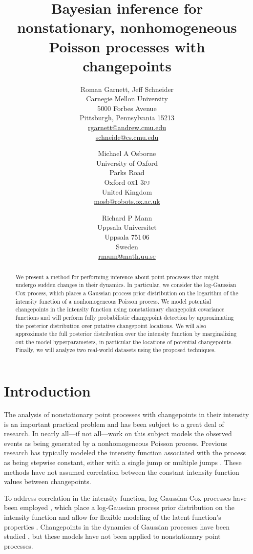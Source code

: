 \documentclass{article}
\title{Bayesian inference for nonstationary, nonhomogeneous Poisson
  processes with changepoints}
\author{
  Roman Garnett, Jeff Schneider\\
  {Carnegie Mellon University}\\
  {5000 Forbes Avenue}\\
  {Pittsburgh, Pennsylvania 15213}\\
  \url{rgarnett@andrew.cmu.edu}\\
  \url{schneide@cs.cmu.edu}
  \and
  Michael A Osborne\\
  {University of Oxford}\\
  {Parks Road}\\
  {Oxford \textsc{ox}1 3\textsc{pj}}\\
  {United Kingdom}\\
  \url{mosb@robots.ox.ac.uk}
  \and
  Richard P Mann\\
  {Uppsala Universitet}\\
  {Uppsala 751\,06}\\
  {Sweden}\\
  \url{rmann@math.uu.se}
}
\begin{document}
\maketitle

\begin{abstract}
  We present a method for performing inference about point processes
  that might undergo sudden changes in their dynamics.  In particular,
  we consider the log-Gaussian Cox process, which places a Gaussian
  process prior distribution on the logarithm of the intensity
  function of a nonhomogeneous Poisson process.  We model potential
  changepoints in the intensity function using nonstationary
  changepoint covariance functions and will perform fully
  probabilistic changepoint detection by approximating the posterior
  distribution over putative changepoint locations.  We will also
  approximate the full posterior distribution over the intensity
  function by marginalizing out the model hyperparameters, in
  particular the locations of potential changepoints.  Finally, we
  will analyze two real-world datasets using the proposed techniques.
\end{abstract}

\section{Introduction}

The analysis of nonstationary point processes with changepoints in
their intensity is an important practical problem and has been subject
to a great deal of research.  In nearly all---if not all---work on
this subject models the observed events as being generated by a
nonhomogeneous Poisson process.  Previous research has typically
modeled the intensity function associated with the process as being
stepwise constant, either with a single jump \citep{rafteryakman,
  carlin, westogden} or multiple jumps \citep{youngkuo, fearnhead,
  adamscp}.  These methods have not assumed correlation between the
constant intensity function values between changepoints.

To address correlation in the intensity function, log-Gaussian Cox
processes have been employed \citep{moller}, which place a
log-Gaussian process prior distribution on the intensity function and
allow for flexible modeling of the latent function's properties
\citep{gpml}.  Changepoints in the dynamics of Gaussian processes have
been studied \citep{cpcj, bocpd}, but these models have not been
applied to nonstationary point processes.
\end{document}

